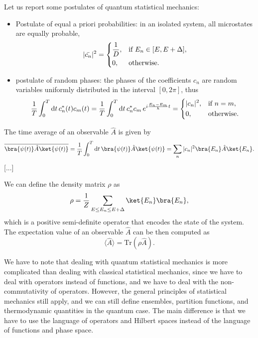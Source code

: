 Let us report some postulates of quantum statistical mechanics:
\begin{itemize}
    \item Postulate of equal a priori probabilities: in an isolated system, all microstates are equally probable,
          \[
              \vert \bar{c_n} \vert^2 = \begin{dcases}
                  \frac{1}{D}, & \text{if } E_n \in [E, E + \Delta], \\
                  0,           & \text{otherwise}.
              \end{dcases}
          \]
    \item postulate of random phases: the phases of the coefficients \(c_n\) are random variables uniformly distributed in the interval \([0, 2\pi]\), thus
          \[
              \frac{1}{T} \int_0^T \mathrm{d}t \, c_n^*(t) c_m(t) = \frac{1}{T}  \int_0^T \mathrm{d}t \, c_n^* c_m \, e^{i \frac{E_n - E_m}{\hbar} t} = \begin{dcases}
                  \vert c_n \vert^2, & \text{if } n = m, \\
                  0,                 & \text{otherwise}.
              \end{dcases}
          \]
\end{itemize}

The time average of an observable \(\hat{A}\) is given by
\[
    \begin{aligned}
        \overline{\bra{\psi(t)} \hat{A} \ket{\psi(t)}} = \frac{1}{T} \int_0^T \mathrm{d}t \, \bra{\psi(t)} \hat{A} \ket{\psi(t)} = \sum_{n} |c_n|^2 \bra{E_n} \hat{A} \ket{E_n}.
    \end{aligned}
\]
[...]

We can define the density matrix \(\rho\) as
\[
    \rho = \frac{1}{Z} \sum_{E \leq E_n \leq E+\Delta} \ket{E_n} \bra{E_n},
\]
which is a positive semi-definite operator that encodes the state of the system. The expectation value of an observable \(\hat{A}\) can be then computed as
\[
    \langle \hat{A} \rangle = \mathrm{Tr}(\rho \hat{A}).
\]



We have to note that dealing with quantum statistical mechanics is more complicated than dealing with classical statistical mechanics, since we have to deal with operators instead of functions, and we have to deal with the non-commutativity of operators. However, the general principles of statistical mechanics still apply, and we can still define ensembles, partition functions, and thermodynamic quantities in the quantum case. The main difference is that we have to use the language of operators and Hilbert spaces instead of the language of functions and phase space.

